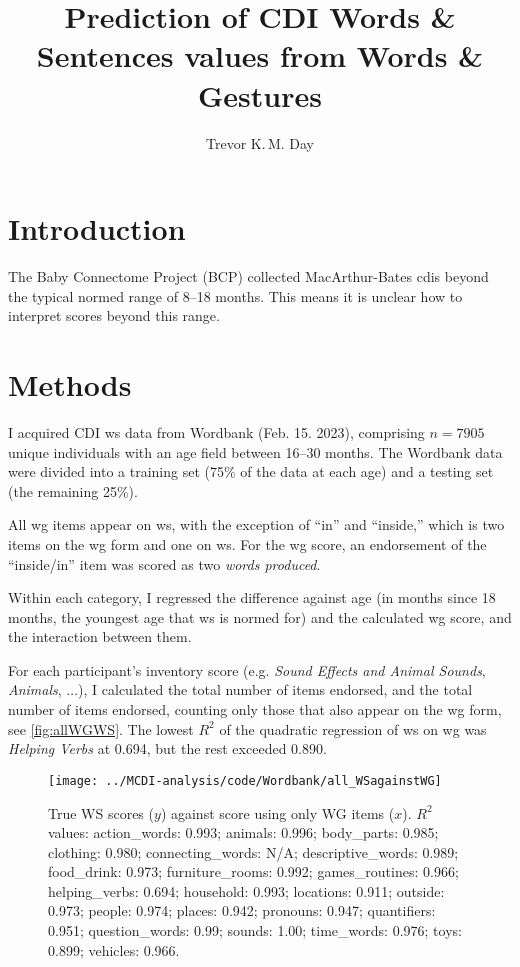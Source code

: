 \documentclass[letterpaper]{article}
\title{Prediction of CDI Words \& Sentences values from Words \& Gestures}
\author{Trevor K.\,M. Day}
\newcommand{\sounds}{\textit{Sound Effects and Animal Sounds}}
\newcommand{\hverbs}{\textit{Helping Verbs}}
\begin{document}
    \maketitle

    \section{Introduction}

    The Baby Connectome Project (BCP) %
    collected MacArthur-Bates \glspl{cdi} %
    beyond the typical normed range of
    8--18 months. This means it is unclear how to interpret scores beyond this
    range.

    \section{Methods}

    I acquired CDI \gls{ws} data from Wordbank %
    (Feb. 15. 2023), comprising $n=7905$ unique individuals with an age field
    between 16--30 months.
    The Wordbank data were divided into a training set (75\% of the data at each
    age) and a testing set (the remaining 25\%).

    All \gls{wg} items appear on \gls{ws}, with the exception of ``in'' and
    ``inside,'' which is two items on the \gls{wg} form and one on \gls{ws}. For
    the \gls{wg} score, an endorsement of the ``inside/in'' item was scored as
    two \textit{words produced}. 
    
    

    Within each category, I regressed the difference against age (in months
    since 18 months, the youngest age that \gls{ws} is normed for) and the
    calculated \gls{wg} score, and the interaction between them.
    
        For each participant's inventory score (e.g. \sounds{}, \textit{Animals},
    $\ldots$), I calculated the total number
    of items endorsed, and the total number of items endorsed, counting only those that also
    appear on the \gls{wg} form, see \autoref{fig:allWGWS}.
    The lowest $R^2$ of the quadratic regression of \gls{ws} on \gls{wg}
    was \hverbs{} at 0.694, but the rest exceeded 0.890.
    
    \begin{figure}
    	\centering
    	\texttt{[image: ../MCDI-analysis/code/Wordbank/all\_WSagainstWG]}
    	\caption{True WS scores ($y$) against score using only WG items ($x$).
    		$R^2$ values: action_words: 0.993; animals: 0.996; body_parts: 0.985;
    		clothing: 0.980; connecting_words: N/A;
    		descriptive_words: 0.989; food_drink: 0.973;
    		furniture_rooms: 0.992; games_routines: 0.966; helping_verbs: 0.694;
    		household: 0.993; locations: 0.911; outside: 0.973; people: 0.974;
    		places: 0.942; pronouns: 0.947; quantifiers: 0.951;
    		question_words: 0.99; sounds: 1.00; time_words: 0.976; toys: 0.899;
    		vehicles: 0.966.}
    	
    	\label{fig:allWGWS}
    	
    \end{figure}
\end{document}
